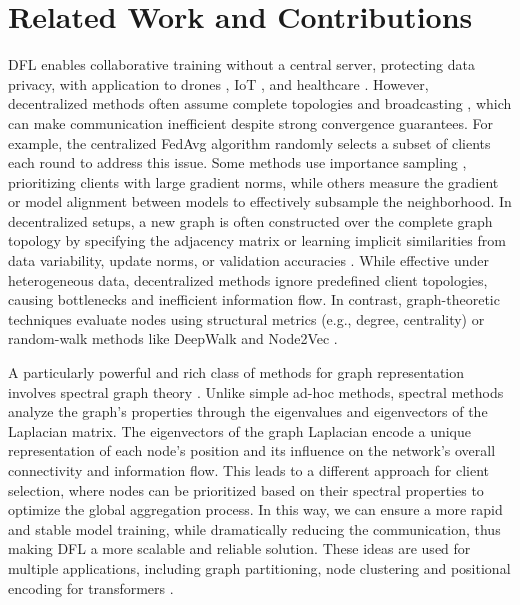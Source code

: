 \documentclass[journal]{IEEEtran}
\begin{document}
\section{Related Work and Contributions}
\label{sec:relwork}

DFL enables collaborative training without a central server, protecting data privacy, with application to drones \cite{drones}, IoT \cite{iot}, and healthcare \cite{healthcare}. However, decentralized methods often assume complete topologies and broadcasting \cite{DSGD}, which can make communication inefficient despite strong convergence guarantees. For example, the centralized FedAvg algorithm \cite{FL} randomly selects a subset of clients each round to address this issue. Some methods use importance sampling \cite{imp_samp1, imp_samp2}, prioritizing clients with large gradient norms, while others measure the gradient or model alignment between models \cite{client_GRAD_sampling, client_GRAD_sampling2} to effectively subsample the neighborhood. In decentralized setups, a new graph is often constructed over the complete graph topology by specifying the adjacency matrix or learning implicit similarities from data variability, update norms, or validation accuracies \cite{graph_select1, graph_select2}. While effective under heterogeneous data, decentralized methods ignore predefined client topologies, causing bottlenecks and inefficient information flow. In contrast, graph-theoretic techniques evaluate nodes using structural metrics (e.g., degree, centrality) or random-walk methods like DeepWalk \cite{deepwalk} and Node2Vec \cite{node2vec}.

A particularly powerful and rich class of methods for graph representation involves spectral graph theory \cite{graph_theory}. Unlike simple ad-hoc methods, spectral methods analyze the graph's properties through the eigenvalues and eigenvectors of the Laplacian matrix. The eigenvectors of the graph Laplacian encode a unique representation of each node's position and its influence on the network's overall connectivity and information flow. This leads to a different approach for client selection, where nodes can be prioritized based on their spectral properties to optimize the global aggregation process. In this way, we can ensure a more rapid and stable model training, while dramatically reducing the communication, thus making DFL a more scalable and reliable solution. These ideas are used for multiple applications, including graph partitioning, node clustering \cite{graph_theory} and positional encoding for transformers \cite{pos_emb}.
\end{document}
